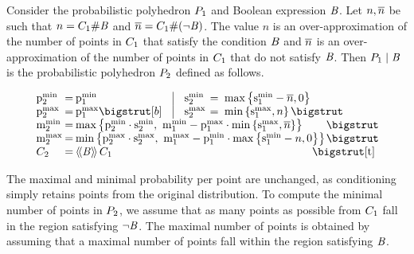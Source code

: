 \begin{definition}
  Consider the probabilistic polyhedron $\ppa$ and Boolean expression
  $\bexp$.  Let $n,\nn$ be such that $n = \absecount{\bexp}{\getpoly{1}}$ and
  $\nn = \absecount{(\neg\bexp)}{\getpoly{1}}$.  
The value $n$ is an over-approximation of the number of points in
$\getpoly{1}$ that satisfy the condition $\bexp$ and $\nn$ is an
over-approximation of the number of points in $\getpoly{1}$ that do
not satisfy $\bexp$.
Then $\absdcond{\ppa}{\bexp}$ is the probabilistic polyhedron $\ppb$
  defined as follows.

\vspace*{-0.9em}
\begin{small}
\[
\setlength{\arraycolsep}{1pt}
\begin{array}{lcl@{\hspace{0.35cm}}|@{\hspace{0.35cm}}lcl}
\pmin{2} &=& \pmin{1} &
\smin{2}\ &=&\ \maxparen{\smin{1} - \nn, 0}\\
\pmax{2} &=& \pmax{1} \bigstrut[b] &
\smax{2} &=&\ \minparen{\smax{1}, n} \bigstrut \\
\mmin{2} &=& \multicolumn{4}{l}{\maxparen{\pmin{2} \cdot
    \smin{2},\ \mmin{1} - \pmax{1} \cdot \minparen{\smax{1}, \nn}}} \bigstrut\\
\mmax{2} &=& \multicolumn{4}{l}{\minparen{\pmax{2} \cdot
    \smax{2},\ \mmax{1} - \pmin{1} \cdot \maxparen{\smin{1}-n, 0}}} \bigstrut\\
\getpoly{2} &=& \multicolumn{4}{l}{\abseeval{\bexp}{\pa}} \bigstrut[t] \\
\end{array}
\]
\end{small}
\end{definition}

The maximal and minimal probability per point
are unchanged, as conditioning simply retains points from
the original distribution.  To compute the minimal number of points in
$\pp{2}$, we assume that
as many points as possible from $\getpoly{1}$ fall in the region
satisfying $\neg\bexp$.  The maximal number of points is obtained by
assuming that a maximal number of points fall within the region
satisfying $\bexp$.

